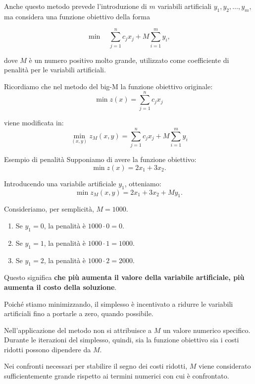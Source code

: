 Anche questo metodo prevede l'introduzione di
$m$ variabili artificiali $y_1,y_2,\ldots,y_m$,
ma considera una funzione obiettivo della forma

\[
\min \quad
\sum_{j=1}^{n}c_jx_j+
M\sum_{i=1}^{m}y_i,
\]

dove $M$ è un numero positivo molto grande,
utilizzato come coefficiente di penalità
per le variabili artificiali.

Ricordiamo che nel metodo del big-M la funzione obiettivo originale:
\[
\min z(x)=\sum_{j=1}^{n}c_jx_j
\]

viene modificata in:
\[
\boxed{\min_{(x,y)} z_M(x,y)=\sum_{j=1}^{n}c_jx_j+M\sum_{i=1}^{m}y_i}
\]
\begin{example}{Esempio di penalità}
    Supponiamo di avere la funzione obiettivo:
\[
\min z(x)=2x_1+3x_2.
\]

Introducendo una variabile artificiale \(y_1\), otteniamo:
\[
\min z_M(x,y)=2x_1+3x_2+My_1.
\]

Consideriamo, per semplicità, \(M=1000\).
\begin{enumerate}
    \item Se \(y_1=0\), la penalità è \(1000\cdot0=0\).
    \item Se \(y_1=1\), la penalità è \(1000\cdot1=1000\).
    \item Se \(y_1=2\), la penalità è \(1000\cdot2=2000\).
\end{enumerate}
Questo significa \textbf{che più aumenta il valore della variabile artificiale, più aumenta il costo della soluzione}.

Poiché stiamo minimizzando, il simplesso è incentivato a ridurre le variabili artificiali fino a portarle a zero, quando possibile.
\end{example}



Nell'applicazione del metodo non si attribuisce
a $M$ un valore numerico specifico.
Durante le iterazioni del simplesso, quindi,
sia la funzione obiettivo sia i costi ridotti
possono dipendere da $M$.

Nei confronti necessari per stabilire il segno
dei costi ridotti, $M$ viene considerato
sufficientemente grande rispetto ai termini numerici
con cui è confrontato.



